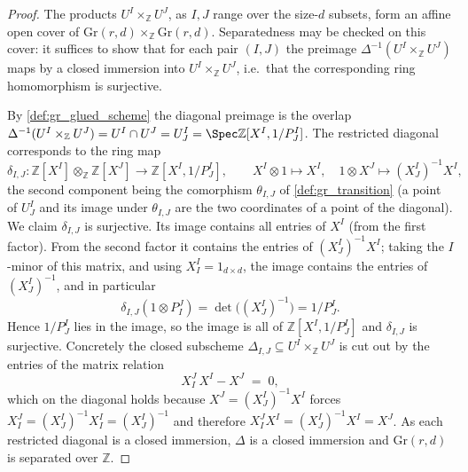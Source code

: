 \begin{proof}
  \leanok
  The products \(U^I \times_{\mathbb{Z}} U^J\), as \(I, J\) range over the
  size-\(d\) subsets, form an affine open cover of \(\mathrm{Gr}(r,d)
  \times_{\mathbb{Z}} \mathrm{Gr}(r,d)\). Separatedness may be checked on this
  cover: it suffices to show that for each pair \((I,J)\) the preimage
  \(\Delta^{-1}(U^I \times_{\mathbb{Z}} U^J)\) maps by a closed immersion into
  \(U^I \times_{\mathbb{Z}} U^J\), i.e.\ that the corresponding ring
  homomorphism is surjective.

  By \cref{def:gr_glued_scheme} the diagonal preimage is the overlap
  \(\Delta^{-1}(U^I \times_{\mathbb{Z}} U^J) = U^I \cap U^J = U^I_J = \Spec
  \mathbb{Z}[X^I, 1/P^I_J]\). The restricted diagonal corresponds to the ring map
  \[
    \delta_{I,J} : \mathbb{Z}[X^I] \otimes_{\mathbb{Z}} \mathbb{Z}[X^J]
    \longrightarrow \mathbb{Z}[X^I, 1/P^I_J],
    \qquad
    X^I \otimes 1 \mapsto X^I, \quad 1 \otimes X^J \mapsto (X^I_J)^{-1} X^I,
  \]
  the second component being the comorphism \(\theta_{I,J}\) of
  \cref{def:gr_transition} (a point of \(U^I_J\) and its image under
  \(\theta_{I,J}\) are the two coordinates of a point of the diagonal). We claim
  \(\delta_{I,J}\) is surjective. Its image contains all entries of \(X^I\)
  (from the first factor). From the second factor it contains the entries of
  \((X^I_J)^{-1} X^I\); taking the \(I\)-minor of this matrix, and using
  \(X^I_I = 1_{d\times d}\), the image contains the entries of \((X^I_J)^{-1}\),
  and in particular
  \[
    \delta_{I,J}(1 \otimes P^J_I) = \det\bigl((X^I_J)^{-1}\bigr) = 1/P^I_J .
  \]
  Hence \(1/P^I_J\) lies in the image, so the image is all of
  \(\mathbb{Z}[X^I, 1/P^I_J]\) and \(\delta_{I,J}\) is surjective. Concretely the
  closed subscheme \(\Delta_{I,J} \subseteq U^I \times_{\mathbb{Z}} U^J\) is cut
  out by the entries of the matrix relation
  \[
    X^J_I \, X^I - X^J \;=\; 0,
  \]
  which on the diagonal holds because \(X^J = (X^I_J)^{-1} X^I\) forces
  \(X^J_I = (X^I_J)^{-1} X^I_I = (X^I_J)^{-1}\) and therefore \(X^J_I X^I =
  (X^I_J)^{-1} X^I = X^J\). As each restricted diagonal is a closed immersion,
  \(\Delta\) is a closed immersion and \(\mathrm{Gr}(r,d)\) is separated over
  \(\mathbb{Z}\).
\end{proof}

